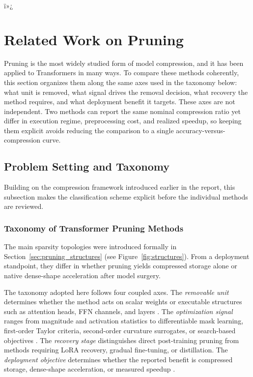 ﻿%
ï»¿\section{Related Work on Pruning}
Pruning is the most widely studied form of model compression, and it has been applied to Transformers in many ways. To compare these methods coherently, this section organizes them along the same axes used in the taxonomy below: what unit is removed, what signal drives the removal decision, what recovery the method requires, and what deployment benefit it targets. These axes are not independent. Two methods can report the same nominal compression ratio yet differ in execution regime, preprocessing cost, and realized speedup, so keeping them explicit avoids reducing the comparison to a single accuracy-versus-compression curve.

\subsection{Problem Setting and Taxonomy}

\providecommand{\methoddetail}[1]{%
    \par\medskip
    \noindent{\bfseries #1}\par
    \smallskip\noindent
}
\providecommand{\methodsep}{%
    \par\smallskip
    \noindent\rule{0.28\textwidth}{0.35pt}
    \par\smallskip
}

Building on the compression framework introduced earlier in the report, this subsection makes the classification scheme explicit before the individual methods are reviewed.

\subsubsection{Taxonomy of Transformer Pruning Methods}

The main sparsity topologies were introduced formally in Section~\ref{sec:pruning_structures} (see Figure~\ref{fig:structures}). From a deployment standpoint, they differ in whether pruning yields compressed storage alone or native dense-shape acceleration after model surgery.

The taxonomy adopted here follows four coupled axes. The \emph{removable unit} determines whether the method acts on scalar weights or executable structures such as attention heads, FFN channels, and layers \cite{michel2022not,kurtic2022optimal}. The \emph{optimization signal} ranges from magnitude and activation statistics to differentiable mask learning, first-order Taylor criteria, second-order curvature surrogates, or search-based objectives \cite{sun2023simple,xia2022structured,ma2023llmpruner,frantar2023sparsegpt,kwon2022fast}. The \emph{recovery stage} distinguishes direct post-training pruning from methods requiring LoRA recovery, gradual fine-tuning, or distillation. The \emph{deployment objective} determines whether the reported benefit is compressed storage, dense-shape acceleration, or measured speedup \cite{kurtic2023ziplm,evopress2024,darwinlm2025}.

